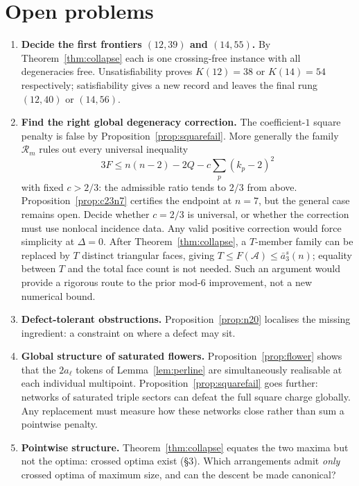 \documentclass[11pt]{article}
\theoremstyle{definition}
\begin{document}
\section{Open problems}

\begin{enumerate}
\item \textbf{Decide the first frontiers $(12,39)$ and $(14,55)$.}
By Theorem~\ref{thm:collapse} each is one crossing-free instance with all
degeneracies free. Unsatisfiability proves $K(12)=38$ or $K(14)=54$
respectively; satisfiability gives a new record and leaves the final rung
$(12,40)$ or $(14,56)$.
\item \textbf{Find the right global degeneracy correction.}
The coefficient-$1$ square penalty is false by
Proposition~\ref{prop:squarefail}. More generally the family
$\mathcal R_m$ rules out every universal inequality
\[
 3F\le n(n-2)-2Q-c\sum_p(k_p-2)^2
\]
with fixed $c>2/3$: the admissible ratio tends to $2/3$ from above.
Proposition~\ref{prop:c23n7} certifies the endpoint at $n=7$, but the general
case remains open. Decide whether $c=2/3$ is universal, or whether the
correction must use nonlocal incidence data. Any valid positive correction
would force simplicity
at $\Delta=0$. After Theorem~\ref{thm:collapse}, a $T$-member family can be
replaced by $T$ distinct triangular faces, giving
$T\le F(\mathcal A)\le\bar a_3^s(n)$; equality between $T$ and the total face
count is not needed. Such an argument would provide a rigorous route to the
prior mod-$6$ improvement, not a new numerical bound.
\item \textbf{Defect-tolerant obstructions.} Proposition~\ref{prop:n20}
localises the missing ingredient: a constraint on where a defect may sit.
\item \textbf{Global structure of saturated flowers.}
Proposition~\ref{prop:flower} shows that the $2a_\ell$ tokens of
Lemma~\ref{lem:perline} are simultaneously realisable at each individual
multipoint. Proposition~\ref{prop:squarefail} goes further: networks of
saturated triple sectors can defeat the full square charge globally.
Any replacement must measure how these networks close rather than sum a
pointwise penalty.
\item \textbf{Pointwise structure.} Theorem~\ref{thm:collapse} equates the
two maxima but not the optima: crossed optima exist (\S3). Which
arrangements admit \emph{only} crossed optima of maximum size, and can the
descent be made canonical?
\end{enumerate}
\end{document}
